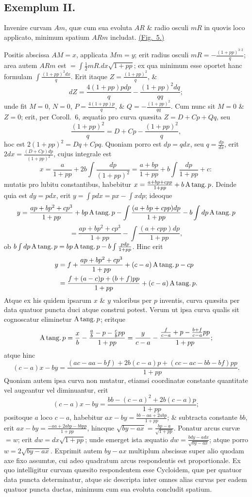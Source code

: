 \subsection*{Exemplum II.}
Invenire curvam $Am$, quæ cum sua evoluta $AR$ \& radio osculi $mR$ in quovis loco applicato, minimum spatium $ARm$ includat. \hyperlink{fig:5}{(Fig.~5.)}

Positis abscissa $AM=x$, applicata $Mm=y$; erit radius osculi $mR=-\frac{(1+pp)^{3:2}}q$; area autem $ARm$ est $=\int\frac12mR.dx\sqrt{1+pp}$; ex qua minimum esse oportet hanc formulam $\int\frac{(1+pp)^2dx}{q}$. Erit itaque $Z=\frac{(1+pp)^2}{q}$, \&
\[dZ=\frac{4(1+pp)pdp}{q}-\frac{(1+pp)^2dq}{qq};\]
unde fit $M=0$, $N=0$, $P=\frac{4(1+pp)p}{q}$, \& $Q=-\frac{(1+pp)^2}{qq}$. Cum nunc sit $M=0$ \& $Z=0$; erit, per Coroll.~6, æquatio pro curva quæsita $Z=D+Cp+Qq$, seu
\[\frac{(1+pp)^2}{q}=D+Cp-\frac{(1+pp)^2}{q},\]
hoc est $2(1+pp)^2=Dq+Cpq$. Quoniam porro est $dp=qdx$, seu $q=\frac{dp}{dx}$, erit $2dx=\frac{(D+Cp)dp}{(1+pp)^2}$, cujus integrale est
\[x=\frac{a}{1+pp}+2b\int\frac{dp}{(1+pp)^2}=\frac{a+bp}{1+pp}+b\int\frac{dp}{1+pp}+c:\]
mutatis pro lubitu constantibus, habebitur $x=\frac{a+bp+cpp}{1+pp}+b\mathop{\rm A\,tang.}p$. Deinde quia est $dy=pdx$, erit $y=\int pdx=px-\int xdp$; ideoque
\[y=\frac{ap+bp^2+cp^3}{1+pp}+bp\mathop{\rm A\,tang.}p-\int\frac{(a+bp+cpp)dp}{1+pp}-b\int dp\mathop{\rm A\,tang.}p\]
\[=\frac{ap+bp^2+cp^3}{1+pp}-\int\frac{(a+cpp)dp}{1+pp},\]
ob $b\int dp\mathop{\rm A\,tang.}p=bp\mathop{\rm A\,tang.}p-b\int\frac{pdp}{1+pp}$. Hinc erit
\[\begin{aligned}
y&=f+\frac{ap+bp^2+cp^3}{1+pp}+(c-a)\mathop{\rm A\,tang.}p-cp\\
&=\frac{f+(a-c)p+(b+f)pp}{1+pp}+(c-a)\mathop{\rm A\,tang.}p.
\end{aligned}\]
Atque ex his quidem ipsarum $x$ \& $y$ valoribus per $p$ inventis, curva quæsita per data quatuor puncta duci atque construi potest. Verum ut ipsa curva qualis sit cognoscatur eliminetur $\mathop{\rm A\,tang.}p$; eritque
\[\mathop{\rm A\,tang.}p=\frac{x}{b}-\frac{\frac ab-p-\frac cbpp}{1+pp}=\frac{y}{c-a}-\frac{\frac f{c-a}+p-\frac{b+f}{c-a}pp}{1+pp};\]
atque hinc
\[(c-a)x-by=\frac{(ac-aa-bf)+2b(c-a)p+(cc-ac-bb-bf)pp}{1+pp}.\]
Quoniam autem ipsa curva non mutatur, etiamsi coordinatæ constante quantitate vel augeantur vel diminuantur, erit
\[(c-a)x-by=\frac{bb-(c-a)^2+2b(c-a)p}{1+pp};\]
positoque $a$ loco $c-a$, habebitur $ax-by=\frac{bb-aa+2abp}{1+pp}$; \& subtracta constante $bb$, erit $ax-by=\frac{-aa+2abp-bbpp}{1+pp}$, hincque $\sqrt{by-ax}=\frac{bp-a}{\sqrt{1+pp}}$. Ponatur arcus curvæ $=w$; erit $dw=dx\sqrt{1+pp}$; unde emerget ista æquatio $dw=\frac{bdy-adx}{\sqrt{by-ax}}$; atque porro $w=2\sqrt{by-ax}$. Exprimit autem $by-ax$ multiplum abscissæ super alio quodam axe fixo assumtæ, cui adeo quadratum arcus respondentis est proportionale. Ex quo intelligitur curvam quæsito respondentem esse Cycloidem, quæ per quatuor data puncta determinatur, atque sic descripta inter omnes alias curvas per eadem quatuor puncta ductas, minimum cum sua evoluta concludit spatium.
